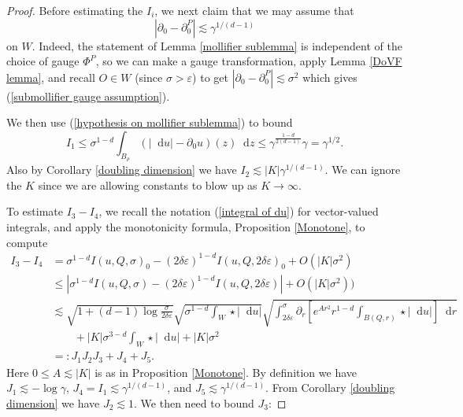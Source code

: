 \documentclass[final,12pt, leqno]{brownthesis}
\newcommand*\dif{\mathop{}\!\mathrm{d}}
\theoremstyle{definition}
\numberwithin{equation}{section}
\begin{document}
\begin{proof}
Before estimating the $I_i$, we next claim that we may assume that
\begin{equation}\label{submollifier gauge assumption}
|\partial_0 - \partial_0^P| \lesssim \gamma^{1/(d - 1)}
\end{equation}
on $W$. Indeed, the statement of Lemma \ref{mollifier sublemma} is independent of the choice of gauge $\Phi^P$, so we can make a gauge transformation, apply Lemma \ref{DoVF lemma}, and recall $O \in W$ (since $\sigma > \varepsilon$) to get $|\partial_0 - \partial_0^P| \lesssim \sigma^2$
which gives (\ref{submollifier gauge assumption}).

We then use (\ref{hypothesis on mollifier sublemma}) to bound
$$I_1 \leq \sigma^{1 - d} \int_{B_\rho} (|\dif u| - \partial_0 u)(z) \dif z \leq \gamma^{\frac{1 - d}{2(d - 1)}} \gamma = \gamma^{1/2}.$$
Also by Corollary \ref{doubling dimension} we have $I_2 \lesssim |K| \gamma^{1/(d - 1)}$.
We can ignore the $K$ since we are allowing constants to blow up as $K \to \infty$.

To estimate $I_3 - I_4$, we recall the notation (\ref{integral of du}) for vector-valued integrals, and apply the monotonicity formula, Proposition \ref{Monotone}, to compute
\begin{align*}
    I_3 - I_4 &= \sigma^{1 - d} I(u, Q, \sigma)_0 - (2 \delta \varepsilon)^{1 - d} I(u, Q, 2\delta\varepsilon)_0 + O(|K| \sigma^2) \\
    &\leq |\sigma^{1 - d} I(u, Q, \sigma) - (2 \delta \varepsilon)^{1 - d} I(u, Q, 2 \delta \varepsilon)| + O(|K| \sigma^2)) \\
    &\lesssim \sqrt{1 + (d - 1) \log \frac{\sigma}{2\delta\varepsilon}} \sqrt{\sigma^{1 - d} \int_W \star |\dif u|} \sqrt{\int_{2\delta\varepsilon}^\sigma \partial_r \left[e^{Ar^2} r^{1 - d} \int_{B(Q, r)} \star |\dif u|\right] \dif r}\\
&\qquad + |K| \sigma^{3 - d} \int_W \star |\dif u| + |K| \sigma^2 \\
&=: J_1 J_2 J_3 + J_4 + J_5.
\end{align*}
Here $0 \leq A \lesssim |K|$ is as in Proposition \ref{Monotone}.
By definition we have $J_1 \lesssim -\log \gamma$, $J_4 = I_1 \lesssim \gamma^{1/(d - 1)}$, and $J_5 \lesssim \gamma^{1/(d - 1)}$.
From Corollary \ref{doubling dimension} we have $J_2 \lesssim 1$.
We then need to bound $J_3$:


\end{proof}
\end{document}
